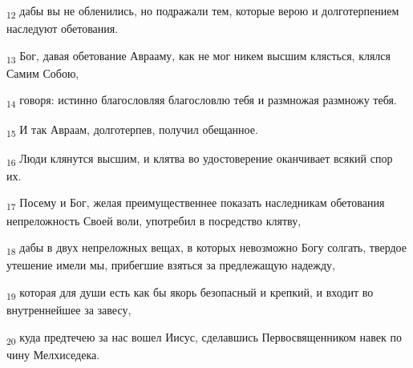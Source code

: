 \begin{tcolorbox}
\textsubscript{12} дабы вы не обленились, но подражали тем, которые верою и долготерпением наследуют обетования.
\end{tcolorbox}
\begin{tcolorbox}
\textsubscript{13} Бог, давая обетование Аврааму, как не мог никем высшим клясться, клялся Самим Собою,
\end{tcolorbox}
\begin{tcolorbox}
\textsubscript{14} говоря: истинно благословляя благословлю тебя и размножая размножу тебя.
\end{tcolorbox}
\begin{tcolorbox}
\textsubscript{15} И так Авраам, долготерпев, получил обещанное.
\end{tcolorbox}
\begin{tcolorbox}
\textsubscript{16} Люди клянутся высшим, и клятва во удостоверение оканчивает всякий спор их.
\end{tcolorbox}
\begin{tcolorbox}
\textsubscript{17} Посему и Бог, желая преимущественнее показать наследникам обетования непреложность Своей воли, употребил в посредство клятву,
\end{tcolorbox}
\begin{tcolorbox}
\textsubscript{18} дабы в двух непреложных вещах, в которых невозможно Богу солгать, твердое утешение имели мы, прибегшие взяться за предлежащую надежду,
\end{tcolorbox}
\begin{tcolorbox}
\textsubscript{19} которая для души есть как бы якорь безопасный и крепкий, и входит во внутреннейшее за завесу,
\end{tcolorbox}
\begin{tcolorbox}
\textsubscript{20} куда предтечею за нас вошел Иисус, сделавшись Первосвященником навек по чину Мелхиседека.
\end{tcolorbox}
